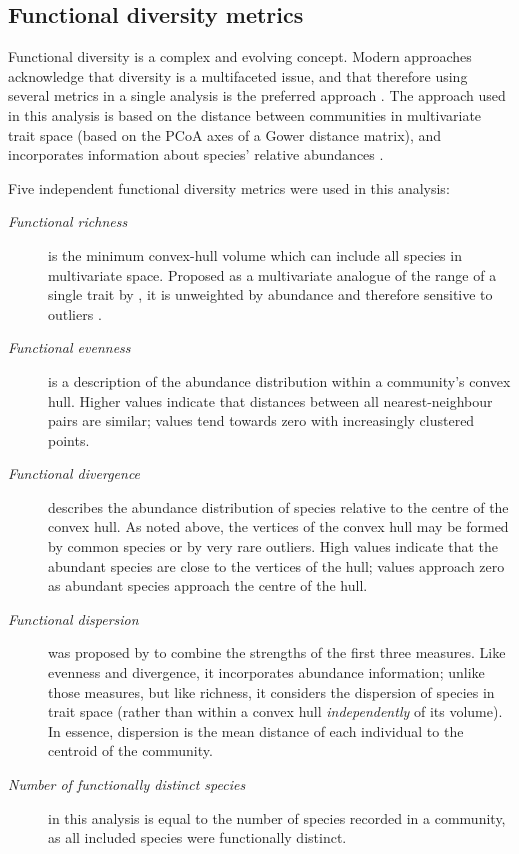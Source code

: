 \documentclass[12pt,a4paper]{book}
\begin{document}
\subsection{Functional diversity metrics}

Functional diversity is a complex and evolving concept. Modern approaches acknowledge that diversity is a multifaceted issue, and that therefore using several metrics in a single analysis is the preferred approach \citep{Laliberte2010}. 
The approach used in this analysis is based on the distance between communities in multivariate trait space (based on the PCoA axes of a Gower distance matrix), and incorporates information about species' relative abundances \citep{Villeger2008}.

Five independent functional diversity metrics were used in this analysis:

\begin{description}
\item[\textit{Functional richness}] is the minimum convex-hull volume which can include all species in multivariate space. Proposed as a multivariate analogue of the range of a single trait by \citet{Villeger2008}, it is unweighted by abundance and therefore sensitive to outliers \citep{Laliberte2010}.
\item[\textit{Functional evenness}] is a description of the abundance distribution within a community's convex hull. Higher values indicate that distances between all nearest-neighbour pairs are similar; values tend towards zero with increasingly clustered points.
\item[\textit{Functional divergence}] describes the abundance distribution of species relative to the centre of the convex hull. As noted above, the vertices of the convex hull may be formed by common species or by very rare outliers. High values indicate that the abundant species are close to the vertices of the hull; values approach zero as abundant species approach the centre of the hull.
\item[\textit{Functional dispersion}] was proposed by \citet{Laliberte2010} to combine the strengths of the first three measures. Like evenness and divergence, it incorporates abundance information; unlike those measures, but like richness, it considers the dispersion of species in trait space (rather than within a convex hull \textit{independently} of its volume). In essence, dispersion is the mean distance of each individual to the centroid of the community.
\item[\textit{Number of functionally distinct species}] in this analysis is equal to the number of species recorded in a community, as all included species were functionally distinct.
\end{description}
\end{document}
